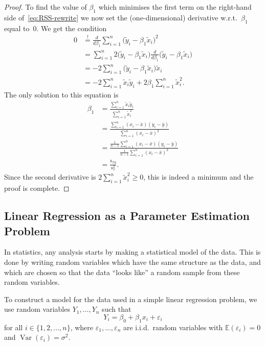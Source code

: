\documentclass[
  a4paper,
]{article}
\theoremstyle{definition}
\theoremstyle{definition}
\theoremstyle{definition}
\theoremstyle{definition}
\theoremstyle{remark}
\begin{document}
\begin{proof}
To find the value of \(\beta_1\) which minimises the first term on the
right-hand side of~\eqref{eq:RSS-rewrite} we now set the
(one-dimensional) derivative w.r.t.~\(\beta_1\) equal to~\(0\). We get
the condition
\begin{align*}
    0
    &\overset{!}{=} \frac{d}{d\beta_1} \sum_{i=1}^n \bigl( \tilde y_i - \beta_1 \tilde x_i \bigr)^2 \\
    &= \sum_{i=1}^n 2 \bigl( \tilde y_i - \beta_1 \tilde x_i \bigr) \frac{d}{d\beta_1} \bigl( \tilde y_i - \beta_1 \tilde x_i \bigr) \\
    &= - 2 \sum_{i=1}^n \bigl( \tilde y_i - \beta_1 \tilde x_i \bigr) \tilde x_i \\
    &= -2  \sum_{i=1}^n \tilde x_i \tilde y_i + 2 \beta_1 \sum_{i=1}^n \tilde x_i^2.
  \end{align*}
The only solution to this equation is
\begin{align*}
    \beta_1
    &= \frac{\sum_{i=1}^n \tilde x_i \tilde y_i}{\sum_{i=1}^n \tilde x_i^2} \\
    &= \frac{\sum_{i=1}^n (x_i - \bar x) (y_i - \bar y)}{\sum_{i=1}^n (x_i - \bar x)^2} \\
    &= \frac{\frac{1}{n-1}\sum_{i=1}^n (x_i - \bar x) (y_i - \bar y)}{\frac{1}{n-1}\sum_{i=1}^n (x_i - \bar x)^2} \\
    &= \frac{\mathrm{s}_{xy}}{\mathrm{s}_x^2}.
  \end{align*}
Since the second derivative is \(2 \sum_{i=1}^n \tilde x_i^2 \geq 0\),
this is indeed a minimum and the proof is complete.
\end{proof}

\hypertarget{linear-regression-as-a-parameter-estimation-problem}{%
\subsection{Linear Regression as a Parameter Estimation Problem}\label{linear-regression-as-a-parameter-estimation-problem}}

In statistics, any analysis starts by making a statistical model of
the data. This is done by writing random variables which have the
same structure as the data, and which are chosen so that the data
``looks like'' a random sample from these random variables.

To construct a model for the data used in a simple linear regression
problem, we use random variables \(Y_1, \ldots, Y_n\) such that
\begin{equation}
  Y_i
  = \beta_0 + \beta_1 x_i + \varepsilon_i \label{eq:regression}
\end{equation}
for all \(i \in \{1, 2, \ldots, n\}\), where \(\varepsilon_1, \ldots, \varepsilon_n\)
are i.i.d.~random variables with \(\mathbb{E}(\varepsilon_i) = 0\) and
\(\mathop{\mathrm{Var}}(\varepsilon_i) = \sigma^2\).
\end{document}
